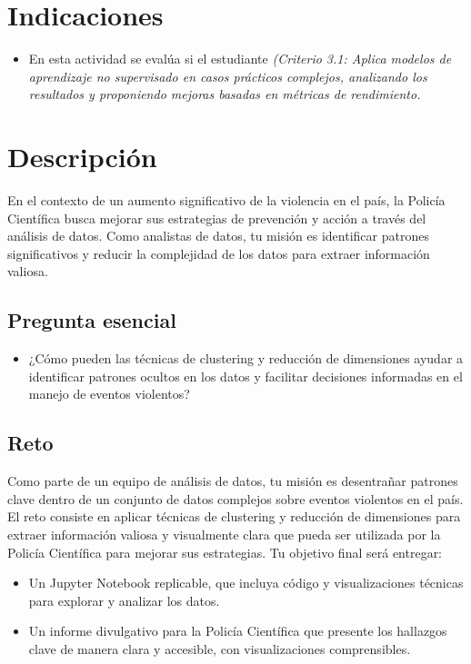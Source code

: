 \documentclass[a4,11pt]{aleph-notas}
\begin{document}
\encabezado

\section{Indicaciones}
\begin{itemize}[leftmargin=*]
\item 
    En esta actividad se evalúa si el estudiante \textit{(Criterio 3.1: Aplica modelos de aprendizaje no supervisado en casos prácticos complejos, analizando los resultados y proponiendo mejoras basadas en métricas de rendimiento.}
\end{itemize}


\section{Descripción}

En el contexto de un aumento significativo de la violencia en el país, la Policía Científica busca mejorar sus estrategias de prevención y acción a través del análisis de datos. Como analistas de datos, tu misión es identificar patrones significativos y reducir la complejidad de los datos para extraer información valiosa.

\subsection*{Pregunta esencial}
\begin{itemize}[leftmargin=*]
\item ¿Cómo pueden las técnicas de clustering y reducción de dimensiones ayudar a identificar patrones ocultos en los datos y facilitar decisiones informadas en el manejo de eventos violentos?
\end{itemize}

\subsection*{Reto}

Como parte de un equipo de análisis de datos, tu misión es desentrañar patrones clave dentro de un conjunto de datos complejos sobre eventos violentos en el país. El reto consiste en aplicar técnicas de clustering y reducción de dimensiones para extraer información valiosa y visualmente clara que pueda ser utilizada por la Policía Científica para mejorar sus estrategias. Tu objetivo final será entregar:
\begin{itemize}[leftmargin=*]
\item Un Jupyter Notebook replicable, que incluya código y visualizaciones técnicas para explorar y analizar los datos.
\item Un informe divulgativo para la Policía Científica que presente los hallazgos clave de manera clara y accesible, con visualizaciones comprensibles.
\end{itemize}
\end{document}
